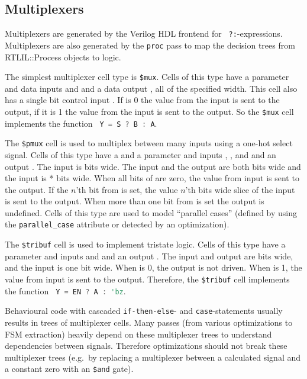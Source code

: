 \subsection{Multiplexers}

Multiplexers are generated by the Verilog HDL frontend for {\tt
?:}-expressions. Multiplexers are also generated by the {\tt proc} pass to map the decision trees
from RTLIL::Process objects to logic.

The simplest multiplexer cell type is {\tt \$mux}. Cells of this type have a  parameter
and data inputs  and  and a data output , all of the specified width. This cell also
has a single bit control input . If  is 0 the value from the  input is sent to
the output, if it is 1 the value from the  input is sent to the output. So the {\tt \$mux}
cell implements the function \lstinline[language=Verilog]; Y = S ? B : A;.

The {\tt \$pmux} cell is used to multiplex between many inputs using a one-hot select signal. Cells
of this type have a  and a  parameter and inputs , , and  and
an output . The  input is  bits wide. The  input and the output are both
 bits wide and the  input is * bits wide. When all bits of
 are zero, the value from  input is sent to the output. If the $n$'th bit from  is
set, the value $n$'th  bits wide slice of the  input is sent to the output. When more
than one bit from  is set the output is undefined. Cells of this type are used to model
``parallel cases'' (defined by using the {\tt parallel\_case} attribute or detected by
an optimization).

The {\tt \$tribuf} cell is used to implement tristate logic. Cells of this type have a 
parameter and inputs  and  and an output . The  input and  output are
 bits wide, and the  input is one bit wide. When  is 0, the output 
is not driven. When  is 1, the value from  input is sent to the  output. Therefore,
the {\tt \$tribuf} cell implements the function \lstinline[language=Verilog]; Y = EN ? A : 'bz;.

Behavioural code with cascaded {\tt if-then-else}- and {\tt case}-statements
usually results in trees of multiplexer cells. Many passes (from various
optimizations to FSM extraction) heavily depend on these multiplexer trees to
understand dependencies between signals. Therefore optimizations should not
break these multiplexer trees (e.g.~by replacing a multiplexer between a
calculated signal and a constant zero with an {\tt \$and} gate).

